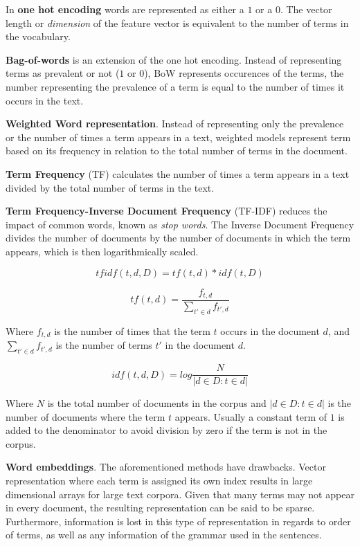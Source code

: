 \documentclass[oneside, english, bibtex]{kththesis}
\begin{document}
In \textbf{one hot encoding} words are represented as either a $1$ or a $0$. The vector length or \textit{dimension} of the feature vector is equivalent to the number of terms in the vocabulary. 

 \textbf{Bag-of-words} is an extension of the one hot encoding. Instead of representing terms as prevalent or not ($1$ or $0$), BoW represents occurences of the terms, the number representing the prevalence of a term is equal to the number of times it occurs in the text.


\textbf{Weighted Word representation}. Instead of representing only the prevalence or the number of times a term appears in a text, weighted models represent term based on its frequency in relation to the total number of terms in the document. 

\textbf{Term Frequency} (TF) calculates the number of times a term appears in a text divided by the total number of terms in the text.

\textbf{Term Frequency-Inverse Document Frequency} (TF-IDF) reduces the impact of common words, known as \textit{stop words}. The Inverse Document Frequency divides the number of documents by the number of documents in which the term appears, which is then logarithmically scaled. 

\begin{equation}
	tfidf(t,d,D) = tf(t,d) * idf(t,D)
  	\label{eqn:tf-idf}
\end{equation}


\begin{equation}
	tf(t,d) = \frac{f_{t,d}}{\sum_{t' \in d} f_{t', d}} 
  	\label{eqn:tf}
\end{equation}

Where $f_{t,d}$ is the number of times that the term $t$ occurs in the document $d$, and $\sum_{t' \in d} f_{t', d}$ is the number of terms $t'$ in the document $d$.

\begin{equation}
	idf(t,d,D) = log \frac{N}{|d \in D : t \in d|}
  	\label{eqn:idf}
\end{equation}

Where $N$ is the total number of documents in the corpus and $|d \in D : t \in d|$ is the number of documents where the term $t$ appears. Usually a constant term of $1$ is added to the denominator to avoid division by zero if the term is not in the corpus.

\textbf{Word embeddings}. The aforementioned methods have drawbacks. Vector representation where each term is assigned its own index results in large dimensional arrays for large text corpora. Given that many terms may not appear in every document, the resulting representation can be said to be sparse. Furthermore, information is lost in this type of representation in regards to order of terms, as well as any information of the grammar used in the sentences.
\end{document}

